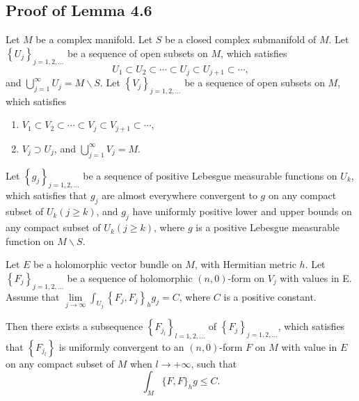 \documentclass[twoside,openany,12pt]{beautynote}
\begin{document}
\subsection{Proof of Lemma 4.6}

\begin{lemma}
  Let $M$ be a complex manifold. Let $S$ be a closed complex submanifold of $M$. Let $\left\{U_j\right\}_{j=1,2, \ldots}$ be a sequence of open subsets on $M$, which satisfies
$$
U_1 \subset U_2 \subset \cdots \subset U_j \subset U_{j+1} \subset \cdots,
$$
and $\bigcup_{j=1}^{\infty} U_j=M \backslash S$. Let $\left\{V_j\right\}_{j=1,2, \ldots}$ be a sequence of open subsets on $M$, which satisfies
\begin{enumerate}
  \item $V_1 \subset V_2 \subset \cdots \subset V_j \subset V_{j+1} \subset \cdots$,
  \item $V_j \supset U_j $, and $\bigcup_{j=1}^{\infty} V_j=M$.
\end{enumerate}

Let $\left\{g_j\right\}_{j=1,2, \ldots}$ be a sequence of positive Lebesgue measurable functions on $U_k$, which satisfies that $g_j$ are almost everywhere convergent to $g$ on any compact subset of $U_k(j \geq k)$, and $g_j$ have uniformly positive lower and upper bounds on any compact subset of $U_k(j \geq k)$, where $g$ is a positive Lebesgue measurable function on $M \backslash S$.

Let $E$ be a holomorphic vector bundle on $M$, with Hermitian metric $h$. Let $\left\{F_j\right\}_{j=1,2, \ldots}$ be a sequence of holomorphic $(n, 0)$-form on $V_j$ with values in E. Assume that $\lim \limits_{j \rightarrow \infty} \int_{U_j}\left\{F_j, F_j\right\}_h g_j=C$, where $C$ is a positive constant.

Then there exists a subsequence $\left\{F_{j_l}\right\}_{l=1,2, \ldots}$ of $\left\{F_j\right\}_{j=1,2, \ldots}$, which satisfies that $\left\{F_{j_l}\right\}$ is uniformly convergent to an $(n, 0)$-form $F$ on $M$ with value in $E$ on any compact subset of $M$ when $l \rightarrow+\infty$, such that
$$
\int_M\{F, F\}_h g \leq C .
$$
\end{lemma}
\end{document}
